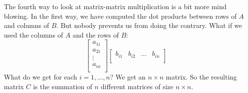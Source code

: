 \documentclass[computationalMathematics.tex]{subfiles}
\begin{document}
\par The fourth way to look at matrix-matrix multiplication is a bit more mind blowing. In the first way, we have computed the dot products between rows of $A$ and columns of $B$. But nobody prevents us from doing the contrary. What if we used the columns of $A$ and the rows of $B$:
\[
  \begin{bmatrix}
    a_{1i} \\
    a_{2i} \\
    \vdots \\
    a_{ni} \\
\end{bmatrix}
\begin{bmatrix}
    b_{i1} & b_{i2} & \dots & b_{in} \\
\end{bmatrix}
\]
What do we get for each $i=1, \ldots, n$? We get an $n \times n$ matrix. So the resulting matrix $C$ is the summation of $n$ different matrices of size $n \times n$. 
\end{document}
